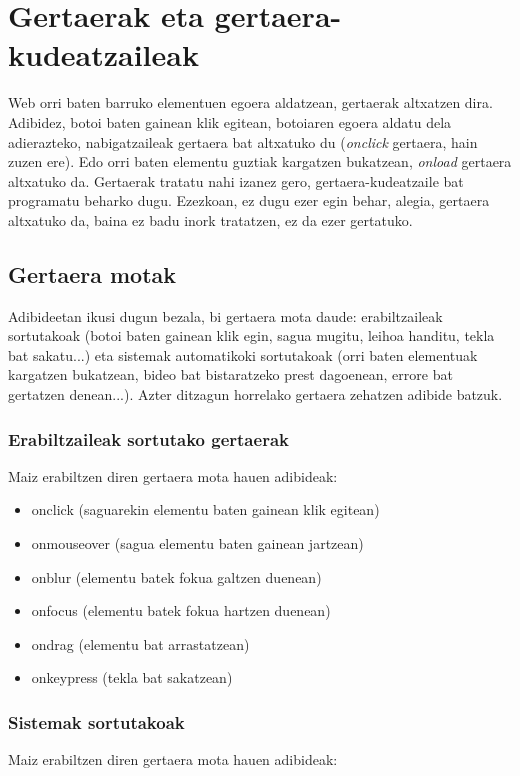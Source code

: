 \chapter{Gertaerak eta gertaera-kudeatzaileak}

Web orri baten barruko elementuen egoera aldatzean, gertaerak altxatzen dira. Adibidez, botoi baten gainean klik egitean, botoiaren egoera aldatu dela adierazteko, nabigatzaileak gertaera bat altxatuko du (\textit{onclick} gertaera, hain zuzen ere). Edo orri baten elementu guztiak kargatzen bukatzean, \textit{onload} gertaera altxatuko da. Gertaerak tratatu nahi izanez gero, gertaera-kudeatzaile bat programatu beharko dugu. Ezezkoan, ez dugu ezer egin behar, alegia, gertaera altxatuko da, baina ez badu inork tratatzen, ez da ezer gertatuko.


\section{Gertaera motak}

Adibideetan ikusi dugun bezala, bi gertaera mota daude: erabiltzaileak sortutakoak (botoi baten gainean klik egin, sagua mugitu, leihoa handitu, tekla bat sakatu...) eta sistemak automatikoki sortutakoak (orri baten elementuak kargatzen bukatzean, bideo bat bistaratzeko prest dagoenean, errore bat gertatzen denean...).  Azter ditzagun horrelako gertaera zehatzen adibide batzuk.

\subsection{Erabiltzaileak sortutako gertaerak}

Maiz erabiltzen diren gertaera mota hauen adibideak:
\begin{itemize}
\item onclick (saguarekin elementu baten gainean klik egitean)
\item {} onmouseover (sagua elementu baten gainean jartzean)
\item {} onblur (elementu batek fokua galtzen duenean)
\item {} onfocus (elementu batek fokua hartzen duenean)
\item {} ondrag (elementu bat arrastatzean)
\item {} onkeypress (tekla bat sakatzean)
\end{itemize}


\subsection{Sistemak sortutakoak}
  Maiz erabiltzen diren gertaera mota hauen adibideak:

